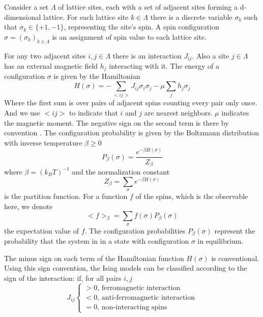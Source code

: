 	Consider a set $\Lambda$ of lattice sites, each with a set of adjacent sites forming a d-dimensional lattice. For each lattice site $k\in\Lambda$ there is a discrete variable $\sigma_k$ such that $\sigma_k \in \{+1, -1\}$, representing the site's spin. A spin configuration $\sigma = \left(\sigma_k\right)_{k\in\Lambda}$ is an assignment of spin value to each lattice site.
	
	For any two adjacent sites $i,j \in \Lambda$ there is an interaction $J_{ij}$. Also a site $j\in \Lambda$ has an external magnetic field $h_j$ interacting with it. The energy of a configuration $\sigma$ is given by the Hamiltonian
	\begin{equation}
		H(\sigma) = - \sum_{<i j>} J_{ij} \sigma_i \sigma_j - \mu \sum_{j} h_j \sigma_j
	\end{equation}
	Where the first sum is over pairs of adjacent spins counting every pair only once. And we use $<ij>$ to indicate that $i$ and $j$ are nearest neighbors. $\mu$ indicates the magnetic moment. The negative sign on the second term is there by convention \cite{Baierlein1999}. The configuration probability is given by the Boltzmann distribution with inverse temperature $\beta \geq 0$
	\begin{equation}
		P_\beta (\sigma) = \frac{e^{- \beta H(\sigma)}}{Z_\beta}
	\end{equation}
	where $\beta = \left(k_B T\right)^{-1}$ and the normalization constant
	\begin{equation}
		Z_\beta = \sum_\sigma e^{-\beta H(\sigma)}
	\end{equation}
	is the partition function. For a function $f$ of the spins, which is the observable here, we denote
	\begin{equation}
		<f>_{\beta} = \sum_{\sigma} f(\sigma) P_\beta(\sigma)
	\end{equation}
	the expectation value of $f$.
	The configuration probabilities $P_\beta(\sigma)$ represent the probability that the system in in a state with configuration $\sigma$ in equilibrium.
	
	
	The minus sign on each term of the Hamiltonian function $H(\sigma)$ is conventional. Using this sign convention, the Ising models can be classified according to the sign of the interaction: if, for all pairs $i,j$
	\begin{equation}
	J_{ij}
	\begin{cases}
		 > 0 \text{, ferromagnetic interaction }\\
		 < 0 \text{, anti-ferromagnetic interaction}\\
		 = 0 \text{, non-interacting spins}
	\end{cases}
	\end{equation}
	
